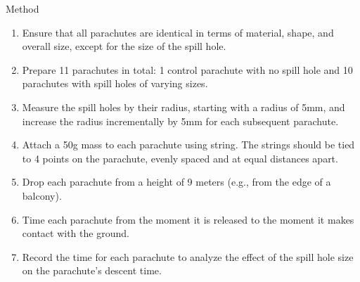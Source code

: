 \documentclass[final]{beamer}
\newlength{\colwidth}
\begin{document}
\begin{frame}[t]
\begin{columns}[t]
\begin{column}{\colwidth}
\begin{block}{Method}
\begin{enumerate}
    \item Ensure that all parachutes are identical in terms of material, shape, and overall size, except for the size of the spill hole.
    
    \item Prepare 11 parachutes in total: 1 control parachute with no spill hole and 10 parachutes with spill holes of varying sizes.


    \item Measure the spill holes by their radius, starting with a radius of 5mm, and increase the radius incrementally by 5mm for each subsequent parachute.

    \item Attach a 50g mass to each parachute using string. The strings should be tied to 4 points on the parachute, evenly spaced and at equal distances apart.

    \item Drop each parachute from a height of 9 meters (e.g., from the edge of a balcony).
    
    \item Time each parachute from the moment it is released to the moment it makes contact with the ground.

    \item Record the time for each parachute to analyze the effect of the spill hole size on the parachute's descent time.
\end{enumerate}



\end{block}
\end{column}
\end{columns}
\end{frame}
\end{document}
